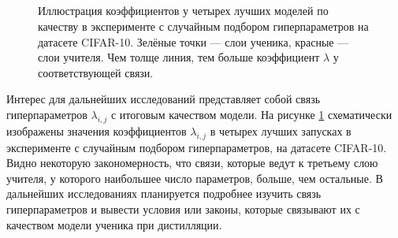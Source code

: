 \begin{figure}[H]
    \begin{minipage}[h]{0.35\linewidth}
         \\
    \end{minipage}
    \hfill
    \begin{minipage}[h]{0.35\linewidth}
         \\
    \end{minipage}
    \vfill
    \begin{minipage}[h]{0.35\linewidth}
         \\
    \end{minipage}
    \hfill
    \begin{minipage}[h]{0.35\linewidth}
         \\
    \end{minipage}
    \caption{Иллюстрация коэффициентов у четырех лучших моделей по качеству в эксперименте с случайным подбором гиперпараметров на датасете CIFAR-10.
        Зелёные точки --- слои ученика, красные --- слои учителя. Чем толще линия, тем больше коэффициент $\lambda$ у соответствующей связи.}
    \label{fig:lines}
\end{figure}

Интерес для дальнейших исследований представляет собой связь гиперпараметров $\lambda_{i,j}$ с итоговым качеством модели.
На рисунке \ref{fig:lines} схематически изображены значения коэффициентов $\lambda_{i,j}$ в четырех лучших запусках в эксперименте с случайным подбором гиперпараметров,
на датасете CIFAR-10. Видно некоторую закономерность, что связи, которые ведут к третьему слою учителя, у которого наибольшее число параметров, больше, чем остальные.
В дальнейших исследованиях планируется подробнее изучить связь гиперпараметров и вывести условия или законы, которые связывают их с качеством модели ученика при дистилляции.

